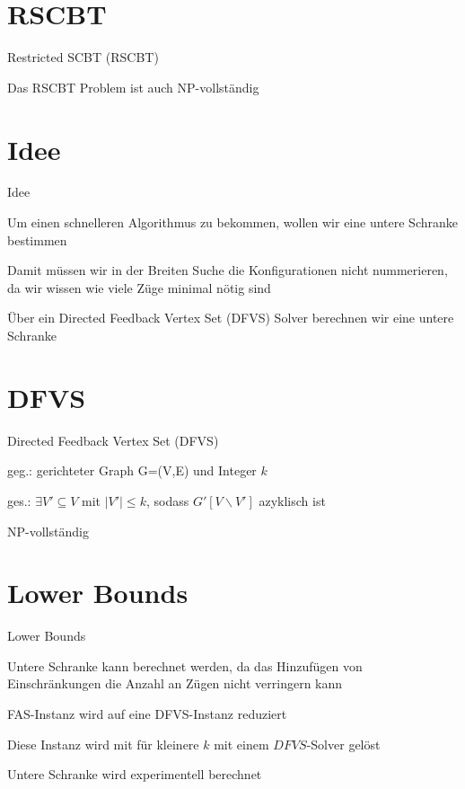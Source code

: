 \documentclass{beamer}
\begin{document}
\section*{RSCBT}
\begin{frame}{Restricted SCBT (RSCBT)}
\begin{pointlist}
\item Das RSCBT Problem ist auch NP-vollständig
\end{pointlist}
\end{frame}

\section*{Idee}
\begin{frame}{Idee}
\begin{pointlist}
\item Um einen schnelleren Algorithmus zu bekommen, wollen wir eine untere Schranke bestimmen
\item Damit müssen wir in der Breiten Suche die Konfigurationen nicht nummerieren, da wir wissen wie viele Züge minimal nötig sind
\item Über ein Directed Feedback Vertex Set (DFVS) Solver berechnen wir eine untere Schranke
\end{pointlist}
\end{frame}

\section*{DFVS}
\begin{frame}{Directed Feedback Vertex Set (DFVS)}
\begin{pointlist}
\item geg.: gerichteter Graph G=(V,E) und Integer $k$
\item ges.: $\exists V' \subseteq V$ mit $|V'|\leq k$, sodass $G'[V\backslash V']$ azyklisch ist
\begin{arrowlist}
\item NP-vollständig
\end{arrowlist}
\end{pointlist}
\end{frame}

\section*{Lower Bounds}
\begin{frame}{Lower Bounds}
\begin{pointlist}
\item Untere Schranke kann berechnet werden, da das Hinzufügen von Einschränkungen die Anzahl an Zügen nicht verringern kann
\item FAS-Instanz wird auf eine DFVS-Instanz reduziert
\item Diese Instanz wird mit für kleinere $k$ mit einem $DFVS$-Solver gelöst
\item Untere Schranke wird experimentell berechnet
\end{pointlist}
\end{frame}
\end{document}
